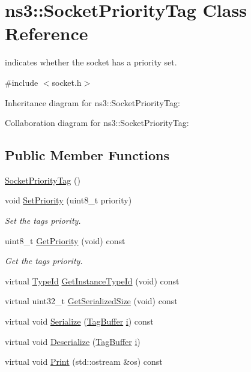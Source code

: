 \hypertarget{classns3_1_1SocketPriorityTag}{}\section{ns3\+:\+:Socket\+Priority\+Tag Class Reference}
\label{classns3_1_1SocketPriorityTag}


indicates whether the socket has a priority set.  




{\ttfamily \#include $<$socket.\+h$>$}



Inheritance diagram for ns3\+:\+:Socket\+Priority\+Tag\+:


Collaboration diagram for ns3\+:\+:Socket\+Priority\+Tag\+:
\subsection*{Public Member Functions}
\begin{DoxyCompactItemize}
\item 
\hyperlink{classns3_1_1SocketPriorityTag_a00ff5a931ba292a29db8bfbbd223a1af}{Socket\+Priority\+Tag} ()
\item 
void \hyperlink{classns3_1_1SocketPriorityTag_aca4be6f3e7c133189a76171488be5cf4}{Set\+Priority} (uint8\+\_\+t priority)
\begin{DoxyCompactList}\small\item\em Set the tag\textquotesingle{}s priority. \end{DoxyCompactList}\item 
uint8\+\_\+t \hyperlink{classns3_1_1SocketPriorityTag_a0791b0b6aa82220a4aca19bd2701a0b7}{Get\+Priority} (void) const 
\begin{DoxyCompactList}\small\item\em Get the tag\textquotesingle{}s priority. \end{DoxyCompactList}\item 
virtual \hyperlink{classns3_1_1TypeId}{Type\+Id} \hyperlink{classns3_1_1SocketPriorityTag_ab876378491c8bb73854428cbb866903c}{Get\+Instance\+Type\+Id} (void) const 
\item 
virtual uint32\+\_\+t \hyperlink{classns3_1_1SocketPriorityTag_a905954d3f1d1cf166c423b39cb507472}{Get\+Serialized\+Size} (void) const 
\item 
virtual void \hyperlink{classns3_1_1SocketPriorityTag_a0c34e776c739dd85324fbdbca352d9dd}{Serialize} (\hyperlink{classns3_1_1TagBuffer}{Tag\+Buffer} \hyperlink{lte__uplink__power__control_8m_a6f6ccfcf58b31cb6412107d9d5281426}{i}) const 
\item 
virtual void \hyperlink{classns3_1_1SocketPriorityTag_aad01112eaf8160798496ee7e1da4be5a}{Deserialize} (\hyperlink{classns3_1_1TagBuffer}{Tag\+Buffer} \hyperlink{lte__uplink__power__control_8m_a6f6ccfcf58b31cb6412107d9d5281426}{i})
\item 
virtual void \hyperlink{classns3_1_1SocketPriorityTag_a40365ac86366844bf816bf6229ebe436}{Print} (std\+::ostream \&os) const 
\end{DoxyCompactItemize}
